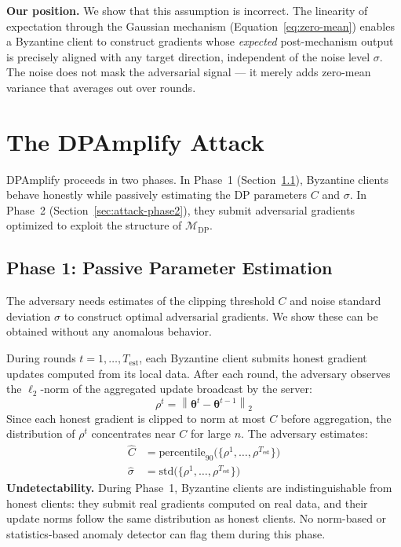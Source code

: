 \documentclass[conference]{IEEEtran}
\begin{document}
\textbf{Our position.} We show that this assumption is
incorrect. The linearity of expectation through the
Gaussian mechanism (Equation~\ref{eq:zero-mean}) enables
a Byzantine client to construct gradients whose
\emph{expected} post-mechanism output is precisely
aligned with any target direction, independent of the
noise level $\sigma$. The noise does not mask the
adversarial signal --- it merely adds zero-mean variance
that averages out over rounds.

\section{The DPAmplify Attack}
\label{sec:attack}

DPAmplify proceeds in two phases. In Phase~1
(Section~\ref{sec:attack-phase1}), Byzantine clients
behave honestly while passively estimating the DP
parameters $C$ and $\sigma$. In Phase~2
(Section~\ref{sec:attack-phase2}), they submit
adversarial gradients optimized to exploit the structure
of $\mathcal{M}_{\mathrm{DP}}$.

\subsection{Phase 1: Passive Parameter Estimation}
\label{sec:attack-phase1}

The adversary needs estimates of the clipping threshold
$C$ and noise standard deviation $\sigma$ to construct
optimal adversarial gradients. We show these can be
obtained without any anomalous behavior.

During rounds $t = 1, \ldots, T_{\mathrm{est}}$, each
Byzantine client submits honest gradient updates
computed from its local data. After each round, the
adversary observes the $\ell_2$-norm of the aggregated
update broadcast by the server:
\begin{equation}
    \rho^t = \left\|\boldsymbol{\theta}^t
    - \boldsymbol{\theta}^{t-1}\right\|_2
\end{equation}
Since each honest gradient is clipped to norm at most
$C$ before aggregation, the distribution of $\rho^t$
concentrates near $C$ for large $n$. The adversary
estimates:
\begin{align}
    \hat{C}
    &= \mathrm{percentile}_{90}
       \bigl(\{\rho^1, \ldots, \rho^{T_{\mathrm{est}}}
       \}\bigr)
    \label{eq:C-estimate} \\
    \hat{\sigma}
    &= \mathrm{std}
       \bigl(\{\rho^1, \ldots, \rho^{T_{\mathrm{est}}}
       \}\bigr)
    \label{eq:sigma-estimate}
\end{align}
\textbf{Undetectability.} During Phase~1, Byzantine clients
are indistinguishable from honest clients: they submit
real gradients computed on real data, and their update
norms follow the same distribution as honest clients.
No norm-based or statistics-based anomaly detector can
flag them during this phase.
\end{document}
